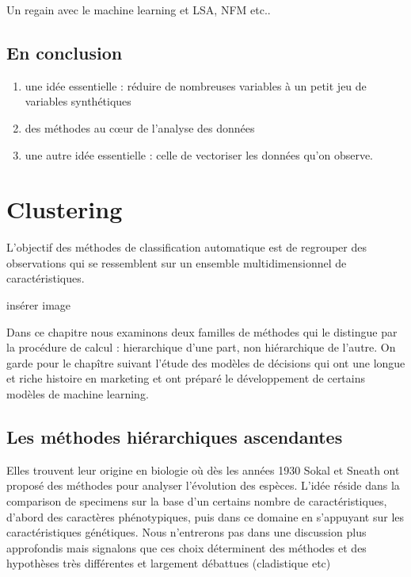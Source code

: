 \documentclass[
]{book}
\begin{document}
Un regain avec le machine learning et LSA, NFM etc..

\hypertarget{en-conclusion}{%
\section{En conclusion}\label{en-conclusion}}

\begin{enumerate}
\def\labelenumi{\arabic{enumi})}
\item
  une idée essentielle : réduire de nombreuses variables à un petit jeu de variables synthétiques
\item
  des méthodes au cœur de l'analyse des données
\item
  une autre idée essentielle : celle de vectoriser les données qu'on observe.
\end{enumerate}

\hypertarget{clus}{%
\chapter{Clustering}\label{clus}}

L'objectif des méthodes de classification automatique est de regrouper des observations qui se ressemblent sur un ensemble multidimensionnel de caractéristiques.

insérer image

Dans ce chapitre nous examinons deux familles de méthodes qui le distingue par la procédure de calcul : hierarchique d'une part, non hiérarchique de l'autre. On garde pour le chapître suivant l'étude des modèles de décisions qui ont une longue et riche histoire en marketing et ont préparé le développement de certains modèles de machine learning.

\hypertarget{les-muxe9thodes-hiuxe9rarchiques-ascendantes}{%
\section{Les méthodes hiérarchiques ascendantes}\label{les-muxe9thodes-hiuxe9rarchiques-ascendantes}}

Elles trouvent leur origine en biologie où dès les années 1930 Sokal et Sneath\citep{sneath_numerical_1973} ont proposé des méthodes pour analyser l'évolution des espèces. L'idée réside dans la comparison de specimens sur la base d'un certains nombre de caractéristiques, d'abord des caractères phénotypiques, puis dans ce domaine en s'appuyant sur les caractéristiques génétiques. Nous n'entrerons pas dans une discussion plus approfondis mais signalons que ces choix déterminent des méthodes et des hypothèses très différentes et largement débattues (cladistique etc)
\end{document}

